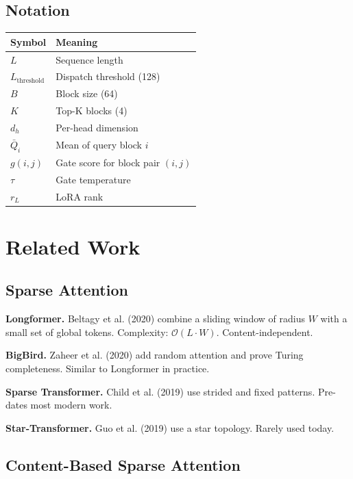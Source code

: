 \subsection{Notation}

\begin{table}[H]
\centering
\small
\begin{tabular}{ll}
\toprule
\textbf{Symbol} & \textbf{Meaning} \\
\midrule
$L$ & Sequence length \\
$L_\text{threshold}$ & Dispatch threshold (128) \\
$B$ & Block size (64) \\
$K$ & Top-K blocks (4) \\
$d_h$ & Per-head dimension \\
$\bar{Q}_i$ & Mean of query block $i$ \\
$g(i, j)$ & Gate score for block pair $(i, j)$ \\
$\tau$ & Gate temperature \\
$r_L$ & LoRA rank \\
\bottomrule
\end{tabular}
\end{table}



\section{Related Work}

\subsection{Sparse Attention}

\textbf{Longformer.} Beltagy et al. (2020) combine a sliding window of radius $W$ 
with a small set of global tokens. Complexity: $\mathcal{O}(L \cdot W)$. 
Content-independent.

\textbf{BigBird.} Zaheer et al. (2020) add random attention and prove Turing 
completeness. Similar to Longformer in practice.

\textbf{Sparse Transformer.} Child et al. (2019) use strided and fixed patterns. 
Pre-dates most modern work.

\textbf{Star-Transformer.} Guo et al. (2019) use a star topology. Rarely used 
today.

\subsection{Content-Based Sparse Attention}

